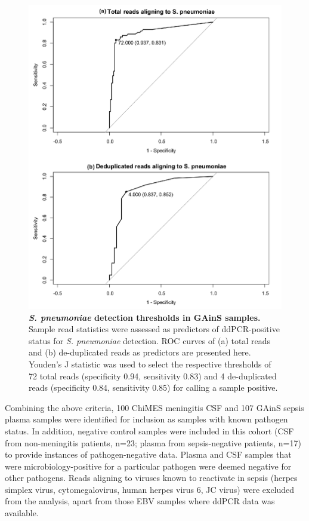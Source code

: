 \FloatBarrier
\begin{figure}[htbp]
\centering
\includegraphics[scale=0.8]{./Results2/Images/strep-threshold.png}
\caption[\textit{S. pneumoniae} detection thresholds in GAinS samples]{\textbf{\textit{S. pneumoniae} detection thresholds in GAinS samples.} Sample read statistics were assessed as predictors of ddPCR-positive status for \textit{S. pneumoniae} detection. ROC curves of (a) total reads and (b) de-duplicated reads as predictors are presented here. Youden's J statistic was used to select the respective thresholds of 72 total reads (specificity 0.94, sensitivity 0.83) and 4 de-duplicated reads (specificity 0.84, sensitivity 0.85) for calling a sample positive.}
\label{fig:strep-threshold}
\end{figure}

Combining the above criteria, 100 ChiMES meningitis CSF and 107 GAinS sepsis plasma samples were identified for inclusion as samples with known pathogen status. In addition, negative control samples were included in this cohort (CSF from non-meningitis patients, n=23; plasma from sepsis-negative patients, n=17) to provide instances of pathogen-negative data. Plasma and CSF samples that were microbiology-positive for a particular pathogen were deemed negative for other pathogens. Reads aligning to viruses known to reactivate in sepsis (herpes simplex virus, cytomegalovirus, human herpes virus 6, JC virus) were excluded from the analysis, apart from those EBV samples where ddPCR data was available.

